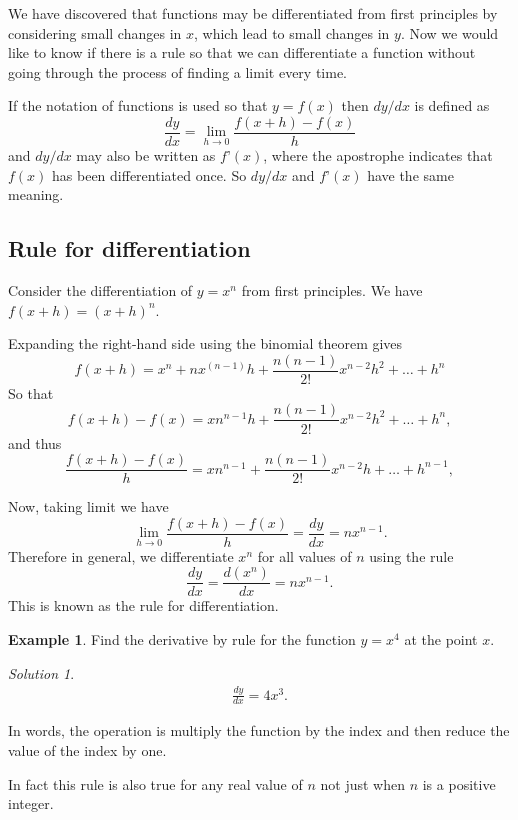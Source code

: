 \documentclass[
  11pt,
  oneside]{book}
\newcommand{\slide}{}
\theoremstyle{definition}
\theoremstyle{definition}
\newtheorem{example}{Example}[chapter]
\theoremstyle{definition}
\theoremstyle{definition}
\theoremstyle{remark}
\newtheorem*{solution}{Solution}
\begin{document}
We have discovered that functions may be differentiated from first principles by considering small changes in \(x\), which lead to small changes in \(y\). Now we would like to know if there is a rule so that we can differentiate a function without going through the process of finding a limit every time.

If the notation of functions is used so that \(y = f(x)\) then \(dy/ dx\) is defined as
\[
\frac{dy}{dx} = \lim\limits_{h\to0}\frac{f(x+h)-f(x)}{h}
\]
and \(dy/ dx\) may also be written as \(f’(x)\), where the apostrophe indicates that \(f(x)\) has been differentiated once. So \(dy/ dx\) and \(f’(x)\) have the same meaning.
\slide

\subsection{Rule for differentiation}\label{rule-for-differentiation}

Consider the differentiation of \(y = x^n\) from first principles. We have \(f(x+h) = (x + h)^n\).

Expanding the right-hand side using the binomial theorem gives
\[
f(x+h) = x^n + nx^{(n-1)}h+\frac{n(n-1)}{2!}x^{n-2}h^2+\ldots+h^n
\]
So that
\[
f(x+h)-f(x) = xn^{n-1}h+\frac{n(n-1)}{2!}x^{n-2}h^2+\ldots + h^n,
\]
and thus
\[
\frac{f(x+h)-f(x)}{h} = xn^{n-1}+\frac{n(n-1)}{2!}x^{n-2}h+\ldots + h^{n-1},
\]
\slide
Now, taking limit we have
\[
\lim\limits_{h\to0}\frac{f(x+h)-f(x)}{h} = \frac{dy}{dx} = nx^{n-1}.
\]
Therefore in general, we differentiate \(x^n\) for all values of \(n\) using the rule
\[
\frac{dy}{dx} = \frac{d(x^n)}{dx} = nx^{n-1}.
\]
This is known as the rule for differentiation.
\slide

\begin{example}
Find the derivative by rule for the function \(y = x^4\) at the point \(x\).
\end{example}

\begin{solution}
\begin{gather*}
\frac{dy}{dx} = 4x^3.
\end{gather*}
\end{solution}

In words, the operation is multiply the function by the index and then reduce the value of the index by one.

In fact this rule is also true for any real value of \(n\) not just when \(n\) is a positive integer.

\slide
\end{document}

